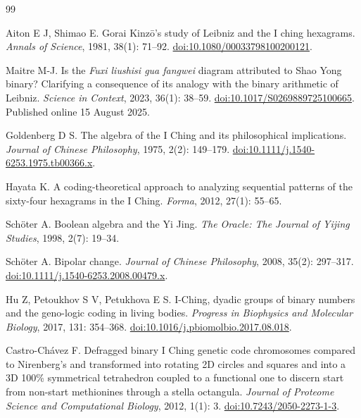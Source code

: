 \documentclass[11pt,a4paper]{article}
\begin{document}
\begin{thebibliography}{99}

Aiton E J, Shimao E.
Gorai Kinz\=o's study of Leibniz and the I ching hexagrams.
\emph{Annals of Science}, 1981, 38(1): 71--92.
\href{https://doi.org/10.1080/00033798100200121}{doi:10.1080/00033798100200121}.

Maitre M-J.
Is the \emph{Fuxi liushisi gua fangwei} diagram attributed to Shao Yong binary?
Clarifying a consequence of its analogy with the binary arithmetic of Leibniz.
\emph{Science in Context}, 2023, 36(1): 38--59.
\href{https://doi.org/10.1017/S0269889725100665}{doi:10.1017/S0269889725100665}.
Published online 15 August 2025.

Goldenberg D S.
The algebra of the I Ching and its philosophical implications.
\emph{Journal of Chinese Philosophy}, 1975, 2(2): 149--179.
\href{https://doi.org/10.1111/j.1540-6253.1975.tb00366.x}{doi:10.1111/j.1540-6253.1975.tb00366.x}.

Hayata K.
A coding-theoretical approach to analyzing sequential patterns of the sixty-four
hexagrams in the I Ching.
\emph{Forma}, 2012, 27(1): 55--65.

Sch\"oter A.
Boolean algebra and the Yi Jing.
\emph{The Oracle: The Journal of Yijing Studies}, 1998, 2(7): 19--34.

Sch\"oter A.
Bipolar change.
\emph{Journal of Chinese Philosophy}, 2008, 35(2): 297--317.
\href{https://doi.org/10.1111/j.1540-6253.2008.00479.x}{doi:10.1111/j.1540-6253.2008.00479.x}.

Hu Z, Petoukhov S V, Petukhova E S.
I-Ching, dyadic groups of binary numbers and the geno-logic coding in living
bodies.
\emph{Progress in Biophysics and Molecular Biology}, 2017, 131: 354--368.
\href{https://doi.org/10.1016/j.pbiomolbio.2017.08.018}{doi:10.1016/j.pbiomolbio.2017.08.018}.

Castro-Ch\'avez F.
Defragged binary I Ching genetic code chromosomes compared to Nirenberg's and
transformed into rotating 2D circles and squares and into a 3D 100\% symmetrical
tetrahedron coupled to a functional one to discern start from non-start
methionines through a stella octangula.
\emph{Journal of Proteome Science and Computational Biology}, 2012, 1(1): 3.
\href{https://doi.org/10.7243/2050-2273-1-3}{doi:10.7243/2050-2273-1-3}.


\end{thebibliography}
\end{document}

